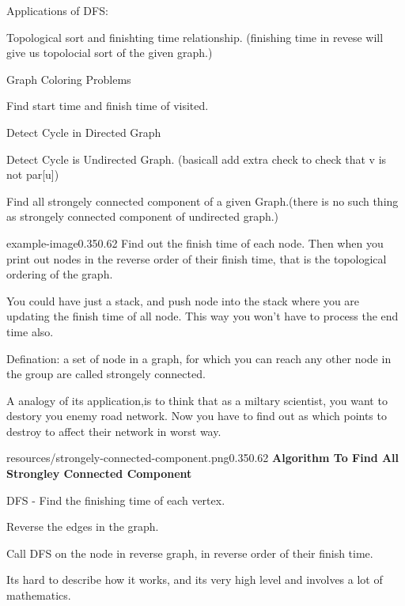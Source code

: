 Applications of DFS:
\begin{compactenum}[(i)]
\item Topological sort and finishting time relationship. (finishing time in revese will give us topolocial sort of the given graph.)
\item Graph Coloring Problems
\item Find start time and finish time of visited.
\item Detect Cycle in Directed Graph
\item Detect Cycle is Undirected Graph. (basicall add extra check to check that v is not par[u])
\item Find all strongely connected component of a given Graph.(there is no such thing as strongely connected component of undirected graph.)
\end{compactenum}

\begin{lfigure}{example-image}{0.35}{0.62}
    Find out the finish time of each node. Then when you print out nodes in the reverse order of their finish time, that is the topological ordering of the graph.

    You could have just a stack, and push node into the stack where you are updating the finish time of all node. This way you won't have to process the end time also.
\end{lfigure}


Defination: a set of node in a graph, for which you can reach any other node in the group are called strongely connected.

A analogy of its application,is to think that as a miltary scientist, you want to destory you enemy road network. Now you have to find out as which points to destroy to affect their network in worst way.

\begin{lfigure}{resources/strongely-connected-component.png}{0.35}{0.62}
   \textbf{Algorithm To Find All Strongley Connected Component}
   \begin{compactenum}
    \item DFS - Find the finishing time of each vertex.
    \item Reverse the edges in the graph.
    \item Call DFS on the node in reverse graph, in reverse order of their finish time.
   \end{compactenum}

   Its hard to describe how it works, and its very high level and involves a lot of mathematics.
\end{lfigure}


